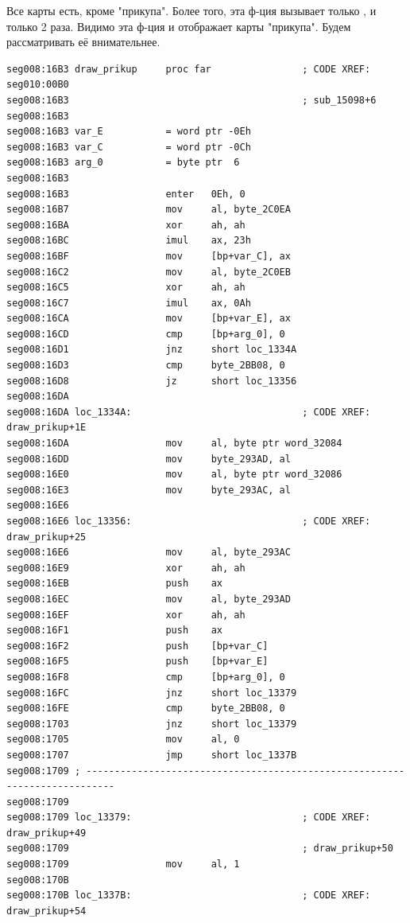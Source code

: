 Все карты есть, кроме "прикупа". Более того, эта ф-ция вызывает только , и только 2 раза.
Видимо эта ф-ция и отображает карты "прикупа".
Будем рассматривать её внимательнее.

\begin{lstlisting}
seg008:16B3 draw_prikup     proc far                ; CODE XREF: seg010:00B0
seg008:16B3                                         ; sub_15098+6
seg008:16B3
seg008:16B3 var_E           = word ptr -0Eh
seg008:16B3 var_C           = word ptr -0Ch
seg008:16B3 arg_0           = byte ptr  6
seg008:16B3
seg008:16B3                 enter   0Eh, 0
seg008:16B7                 mov     al, byte_2C0EA
seg008:16BA                 xor     ah, ah
seg008:16BC                 imul    ax, 23h
seg008:16BF                 mov     [bp+var_C], ax
seg008:16C2                 mov     al, byte_2C0EB
seg008:16C5                 xor     ah, ah
seg008:16C7                 imul    ax, 0Ah
seg008:16CA                 mov     [bp+var_E], ax
seg008:16CD                 cmp     [bp+arg_0], 0
seg008:16D1                 jnz     short loc_1334A
seg008:16D3                 cmp     byte_2BB08, 0
seg008:16D8                 jz      short loc_13356
seg008:16DA
seg008:16DA loc_1334A:                              ; CODE XREF: draw_prikup+1E
seg008:16DA                 mov     al, byte ptr word_32084
seg008:16DD                 mov     byte_293AD, al
seg008:16E0                 mov     al, byte ptr word_32086
seg008:16E3                 mov     byte_293AC, al
seg008:16E6
seg008:16E6 loc_13356:                              ; CODE XREF: draw_prikup+25
seg008:16E6                 mov     al, byte_293AC
seg008:16E9                 xor     ah, ah
seg008:16EB                 push    ax
seg008:16EC                 mov     al, byte_293AD
seg008:16EF                 xor     ah, ah
seg008:16F1                 push    ax
seg008:16F2                 push    [bp+var_C]
seg008:16F5                 push    [bp+var_E]
seg008:16F8                 cmp     [bp+arg_0], 0
seg008:16FC                 jnz     short loc_13379
seg008:16FE                 cmp     byte_2BB08, 0
seg008:1703                 jnz     short loc_13379
seg008:1705                 mov     al, 0
seg008:1707                 jmp     short loc_1337B
seg008:1709 ; ---------------------------------------------------------------------------
seg008:1709
seg008:1709 loc_13379:                              ; CODE XREF: draw_prikup+49
seg008:1709                                         ; draw_prikup+50
seg008:1709                 mov     al, 1
seg008:170B
seg008:170B loc_1337B:                              ; CODE XREF: draw_prikup+54

\end{lstlisting}
